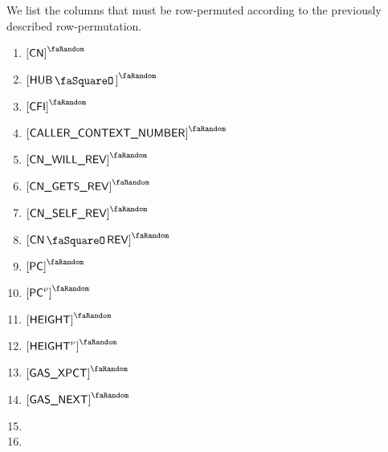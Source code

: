 We list the columns that must be row-permuted according to the previously described row-permutation.
\begin{multicols}{4}
	\begin{enumerate}
		\item $\order{\cn}$
		\item $\order{\hubStamp}$
		\item $\order{\cfi}$
		\item $\order{\caller}$
		\item $\order{\cnWillRev}$
		\item $\order{\cnGetsRev}$
		\item $\order{\cnSelfRev}$
		\item $\order{\cnRevStamp}$
		\item $\order{\pc}$
		\item $\order{\pc\new}$
		\item $\order{\height}$
		\item $\order{\height\new}$
		\item $\order{\gasExpected}$
		\item $\order{\gasNext}$
		\item[\vspace{\fill}]
		\item[\vspace{\fill}]
	\end{enumerate}
\end{multicols}
